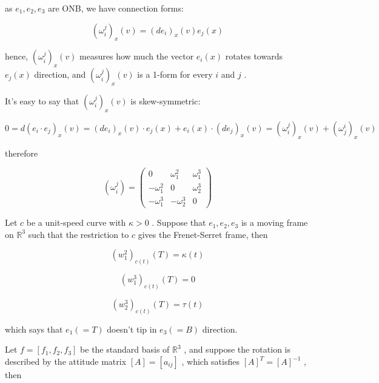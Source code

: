 \documentclass[lang=cn,a4paper,11pt,openany,twoside]{elegantbook}
\begin{document}
as \({e}_{1},{e}_{2},{e}_{3}\) are ONB, we have connection forms:

\[
{\left( {\omega }_{i}^{j}\right) }_{x}\left( v\right)  = {\left( d{e}_{i}\right) }_{x}\left( v\right) {e}_{j}\left( x\right)
\]

hence, \({\left( {\omega }_{i}^{j}\right) }_{x}\left( v\right)\) measures how much the vector \({e}_{i}\left( x\right)\) rotates towards \({e}_{j}\left( x\right)\) direction, and \({\left( {\omega }_{i}^{j}\right) }_{x}\left( v\right)\) is a 1-form for every \(i\) and \(j\) .

It’s easy to say that \({\left( {\omega }_{i}^{j}\right) }_{x}\left( v\right)\) is skew-symmetric:

\[
0 = d{\left( {e}_{i} \cdot  {e}_{j}\right) }_{x}\left( v\right)  = {\left( d{e}_{i}\right) }_{x}\left( v\right)  \cdot  {e}_{j}\left( x\right)  + {e}_{i}\left( x\right)  \cdot  {\left( d{e}_{j}\right) }_{x}\left( v\right)  = {\left( {\omega }_{i}^{j}\right) }_{x}\left( v\right)  + {\left( {\omega }_{j}^{i}\right) }_{x}\left( v\right)
\]

therefore

\[
\left( {\omega }_{i}^{j}\right)  = \left( \begin{matrix} 0 & {\omega }_{1}^{2} & {\omega }_{1}^{3} \\   - {\omega }_{1}^{2} & 0 & {\omega }_{2}^{3} \\   - {\omega }_{1}^{3} &  - {\omega }_{2}^{3} & 0 \end{matrix}\right)
\]

Let \(c\) be a unit-speed curve with \(\kappa  > 0\) . Suppose that \({e}_{1},{e}_{2},{e}_{3}\) is a moving frame on \({\mathbb{R}}^{3}\) such that the restriction to \(c\) gives the Frenet-Serret frame, then

\[
{\left( {w}_{1}^{2}\right) }_{c\left( t\right) }\left( T\right)  = \kappa \left( t\right)
\]

\[
{\left( {w}_{1}^{3}\right) }_{c\left( t\right) }\left( T\right)  = 0
\]

\[
{\left( {w}_{2}^{3}\right) }_{c\left( t\right) }\left( T\right)  = \tau \left( t\right)
\]

which says that \({e}_{1}\left( { = T}\right)\) doesn’t tip in \({e}_{3}\left( { = B}\right)\) direction.

Let \(f = \left\lbrack  {{f}_{1},{f}_{2},{f}_{3}}\right\rbrack\) be the standard basis of \({\mathbb{R}}^{3}\) , and suppose the rotation is described by the attitude matrix \(\left\lbrack  A\right\rbrack   = \left\lbrack  {a}_{ij}\right\rbrack\) , which satisfies \({\left\lbrack  A\right\rbrack  }^{T} = {\left\lbrack  A\right\rbrack  }^{-1}\) , then
\end{document}

